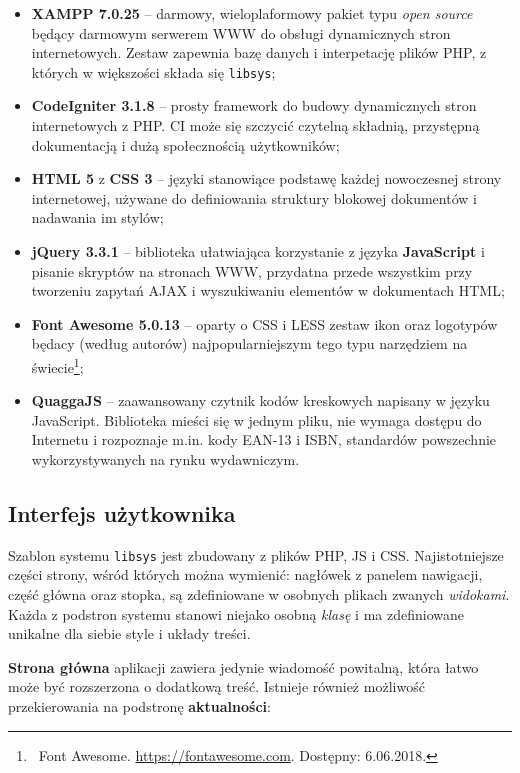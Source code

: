 \documentclass[12pt, a4paper]{article}
\begin{document}
\begin{itemize}
    \item \textbf{XAMPP 7.0.25} -- darmowy, wieloplaformowy pakiet typu \textit{open source} będący darmowym serwerem WWW do obsługi dynamicznych stron internetowych. Zestaw zapewnia bazę danych i interpetację plików PHP, z których w większości składa się \texttt{libsys};
    \item \textbf{CodeIgniter 3.1.8} -- prosty framework do budowy dynamicznych stron internetowych z PHP. CI może się szczycić czytelną składnią, przystępną dokumentacją i dużą społecznością użytkowników; 
    \item \textbf{HTML 5} z \textbf{CSS 3} -- języki stanowiące podstawę każdej nowoczesnej strony internetowej, używane do definiowania struktury blokowej dokumentów i nadawania im stylów;
    \item \textbf{jQuery 3.3.1} -- biblioteka ułatwiająca korzystanie z języka \textbf{JavaScript} i pisanie skryptów na stronach WWW, przydatna przede wszystkim przy tworzeniu zapytań AJAX i wyszukiwaniu elementów w dokumentach HTML;
    \item \textbf{Font Awesome 5.0.13} -- oparty o CSS i LESS zestaw ikon oraz logotypów będacy (według autorów) najpopularniejszym tego typu narzędziem na świecie\footnote{\ Font Awesome. \url{https://fontawesome.com}. Dostępny: 6.06.2018.};
    \item \textbf{QuaggaJS} -- zaawansowany czytnik kodów kreskowych napisany w języku JavaScript. Biblioteka mieści się w jednym pliku, nie wymaga dostępu do Internetu i rozpoznaje m.in. kody EAN-13 i ISBN, standardów powszechnie wykorzystywanych na rynku wydawniczym.
\end{itemize}


\newpage
\subsection{Interfejs użytkownika}

Szablon systemu \texttt{libsys} jest zbudowany z plików PHP, JS i CSS. Najistotniejsze części strony, wśród których można wymienić: nagłówek z panelem nawigacji, część główna oraz stopka, są zdefiniowane w osobnych plikach zwanych \textit{widokami}. Każda z podstron systemu stanowi niejako osobną \textit{klasę} i ma zdefiniowane unikalne dla siebie style i układy treści.

\textbf{Strona główna} aplikacji zawiera jedynie wiadomość powitalną, która łatwo może być rozszerzona o dodatkową treść. Istnieje również możliwość przekierowania na podstronę \textbf{aktualności}:
\end{document}
